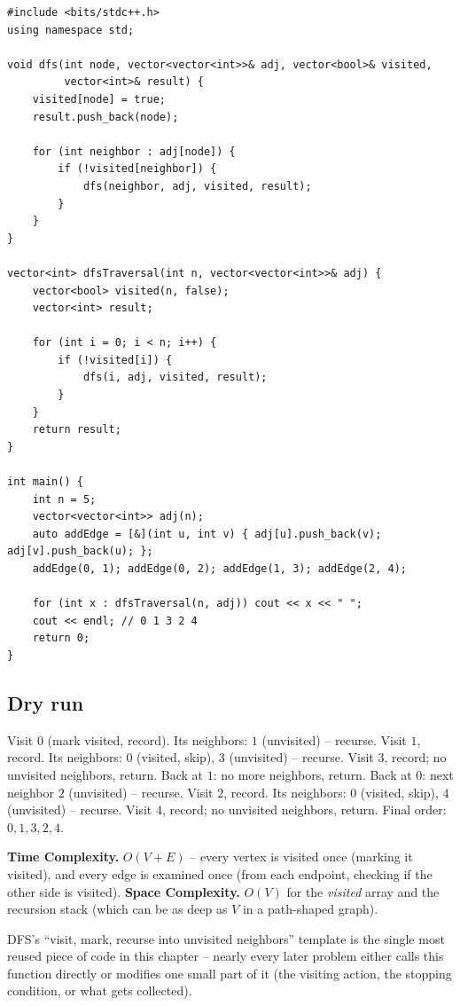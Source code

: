 \begin{lstlisting}
#include <bits/stdc++.h>
using namespace std;

void dfs(int node, vector<vector<int>>& adj, vector<bool>& visited,
         vector<int>& result) {
    visited[node] = true;
    result.push_back(node);

    for (int neighbor : adj[node]) {
        if (!visited[neighbor]) {
            dfs(neighbor, adj, visited, result);
        }
    }
}

vector<int> dfsTraversal(int n, vector<vector<int>>& adj) {
    vector<bool> visited(n, false);
    vector<int> result;

    for (int i = 0; i < n; i++) {
        if (!visited[i]) {
            dfs(i, adj, visited, result);
        }
    }
    return result;
}

int main() {
    int n = 5;
    vector<vector<int>> adj(n);
    auto addEdge = [&](int u, int v) { adj[u].push_back(v); adj[v].push_back(u); };
    addEdge(0, 1); addEdge(0, 2); addEdge(1, 3); addEdge(2, 4);

    for (int x : dfsTraversal(n, adj)) cout << x << " ";
    cout << endl; // 0 1 3 2 4
    return 0;
}
\end{lstlisting}

\subsection*{Dry run}


Visit $0$ (mark visited, record). Its neighbors: $1$ (unvisited) --
recurse. Visit $1$, record. Its neighbors: $0$ (visited, skip), $3$
(unvisited) -- recurse. Visit $3$, record; no unvisited neighbors,
return. Back at $1$: no more neighbors, return. Back at $0$: next
neighbor $2$ (unvisited) -- recurse. Visit $2$, record. Its neighbors:
$0$ (visited, skip), $4$ (unvisited) -- recurse. Visit $4$, record; no
unvisited neighbors, return. Final order: $0,1,3,2,4$.

\begin{complexitybox}
\textbf{Time Complexity.} $O(V+E)$ -- every vertex is visited once
(marking it visited), and every edge is examined once (from each
endpoint, checking if the other side is visited).
\textbf{Space Complexity.} $O(V)$ for the \textit{visited} array and
the recursion stack (which can be as deep as $V$ in a path-shaped
graph).
\end{complexitybox}

\begin{takeawaybox}
DFS's ``visit, mark, recurse into unvisited neighbors'' template is the
single most reused piece of code in this chapter -- nearly every later
problem either calls this function directly or modifies one small part
of it (the visiting action, the stopping condition, or what gets
collected).
\end{takeawaybox}
